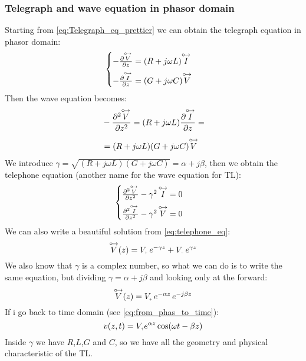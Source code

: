 \subsubsection*{Telegraph and wave equation in phasor domain}
Starting from \cref{eq:Telegraph_eq_prettier} we can obtain the telegraph equation in phasor domain:
\begin{equation}
  \begin{cases}\label{eq:telegraph_in_phas_1}
  -\frac{\partial \overset{\mathbin {{\circ \mkern-2.5mu\rightarrow}}}{V}}{\partial z}=(R+j\omega L)\overset{\mathbin {{\circ \mkern-2.5mu\rightarrow}}}{I}\\[5pt]
  -\frac{\partial \overset{\mathbin {{\circ \mkern-2.5mu\rightarrow}}}{I}}{\partial z}=(G+j\omega C)\overset{\mathbin {{\circ \mkern-2.5mu\rightarrow}}}{V}
  \end{cases}
\end{equation}
Then the wave equation becomes:
\begin{align}
  \begin{split}
    &-\frac{\partial^2 \overset{\mathbin {{\circ \mkern-2.5mu\rightarrow}}}{V}}{\partial z^2}=(R+j\omega L)\frac{\partial \overset{\mathbin {{\circ \mkern-2.5mu\rightarrow}}}{I}}{\partial z}=\\[5pt]
    &=(R+j\omega L)(G+j\omega C)\overset{\mathbin {{\circ \mkern-2.5mu\rightarrow}}}{V}
  \end{split}
\end{align}
We introduce $\gamma = \sqrt{(R+j\omega L)(G+j\omega C)}=\alpha+j\beta$, then we obtain the telephone equation (another name for the wave equation for TL):
\begin{equation}
  \begin{cases}
  \frac{\partial^2 \overset{\mathbin {{\circ \mkern-2.5mu\rightarrow}}}{V}}{\partial z^2}-\gamma^2\,\overset{\mathbin {{\circ \mkern-2.5mu\rightarrow}}}{I}=0\\[5pt]
  \frac{\partial^2 \overset{\mathbin {{\circ \mkern-2.5mu\rightarrow}}}{I}}{\partial z^2}-\gamma^2\,\overset{\mathbin {{\circ \mkern-2.5mu\rightarrow}}}{V}=0
  \end{cases}\label{eq:telephone_eq}
\end{equation}
We can also write a beautiful solution from \cref{eq:telephone_eq}:
\begin{equation}\label{eq:voltage_in_phas_domain}
  \phas{V}(z)=V\bottomPlus \,e^{-\gamma z}+V\bottomMinus \,e^{\gamma z}
\end{equation}
We also know that $\gamma$ is a complex number, so what we can do is to write the same equation, but dividing $\gamma = \alpha+j\beta$ and looking only at the forward:
\begin{equation}
  \phas{V}(z)=V\bottomPlus \,e^{-\alpha z}\,e^{-j\beta z}
\end{equation}
If i go back to time domain (see \cref{eq:from_phas_to_time}):
\begin{equation}\label{eq:from_phas_to_time_TL}
  v(z,t)=V\bottomPlus e^{\alpha z}\cos(\omega t-\beta z)
\end{equation}
Inside $\gamma $ we have $R$,$L$,$G$ and $C$, so we have all the geometry and physical characteristic of the TL.
